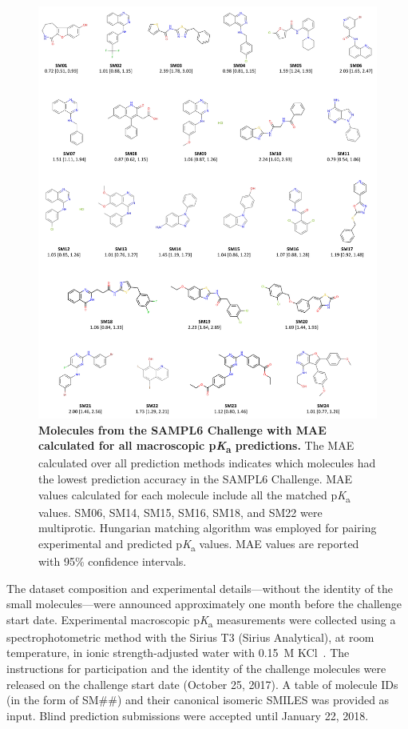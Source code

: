 \documentclass[9pt,lineno,final]{elife}
\newcommand{\pKa}{p\textit{K}\textsubscript{a}}
\begin{document}
\begin{figure}
\begin{center}
\includegraphics[width=0.95\linewidth]{figures/molecules_with_MAE_of_all_methods.pdf}
\caption{{\bf Molecules from the SAMPL6 Challenge with MAE calculated for all macroscopic \pKa{} predictions.} 
The MAE calculated over all prediction methods indicates which molecules had the lowest prediction accuracy in the SAMPL6 Challenge. 
MAE values calculated for each molecule include all the matched \pKa{} values. 
SM06, SM14, SM15, SM16, SM18, and SM22 were multiprotic. 
Hungarian matching algorithm was employed for pairing experimental and predicted \pKa{} values. 
MAE values are reported with 95\% confidence intervals.
}
\label{fig:molecules_with_MAE_of_all_methods}
\end{center}
\end{figure}

The dataset composition and experimental details---without the identity of the small molecules---were announced approximately one month before the challenge start date. 
Experimental macroscopic \pKa{} measurements were collected using a spectrophotometric method with the Sirius T3 (Sirius Analytical), at room temperature, in ionic strength-adjusted water with 0.15~M KCl~\citep{Isik:2018:J.Comput.AidedMol.Des.}. 
The instructions for participation and the identity of the challenge molecules were released on the challenge start date (October 25, 2017). 
A table of molecule IDs (in the form of SM\#\#) and	their canonical isomeric SMILES was provided as input.
Blind prediction submissions were accepted until January 22, 2018. 
\end{document}
